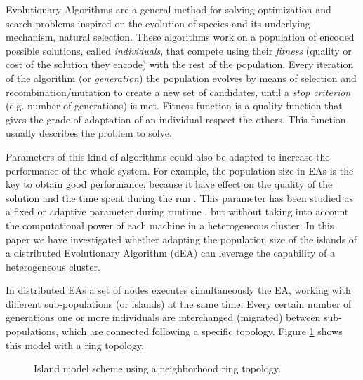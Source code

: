 \documentclass[final,1p,times]{elsarticle}
\begin{document}
Evolutionary Algorithms are a general method for solving
optimization and search problems inspired on the evolution of species
and its underlying mechanism, natural selection. These algorithms work
on a population of encoded
possible solutions, called {\em individuals}, that compete using their
{\em fitness} (quality or cost of the solution they encode) with the
rest of the
population. Every iteration of the algorithm (or {\em generation}) the
population evolves by means of selection and recombination/mutation to
create a new set of candidates, until a {\em stop criterion}
(e.g. number of generations) is met. Fitness function is a quality
function that gives the grade of adaptation of an individual respect
the others. This function usually describes the problem to solve. 





Parameters of this kind of algorithms could also be
adapted to increase the performance of the whole system. For example,
the population size in EAs
 is the key to
obtain good performance, because it have effect on the quality of the
solution and the time spent during the run
\cite{ShrinkageLaredo09}. This parameter has been studied as a fixed
\cite{SizingHarik99} or adaptive parameter during runtime
\cite{AdaptiveLobo07,SelfRegulatedSizeFernandes06}, but without taking
into account the computational power of each machine in a
heterogeneous cluster. In this paper we have investigated whether
adapting the population size of the islands of a distributed
Evolutionary Algorithm (dEA) \cite{MULTIKULTI} can leverage the
capability of a heterogeneous cluster. 


In distributed EAs a set of nodes executes simultaneously the EA,
working with different sub-populations (or islands) at the same
time. Every certain number of generations one or more individuals are
interchanged (migrated) between sub-populations, which are connected
following a specific topology. Figure \ref{fig:islands} shows this
model with a ring topology.   




\begin{figure}[htb]
\centering
{}
\caption{Island model scheme using a neighborhood ring topology.}
\label{fig:islands}
\end{figure}
\end{document}
